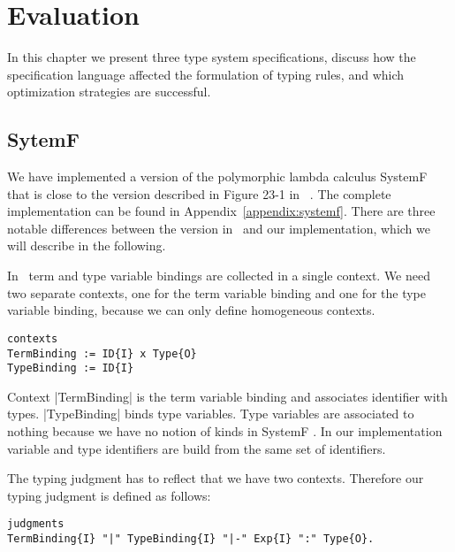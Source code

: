 \chapter{Evaluation}
\label{cha:evaluation}
In this chapter we present three type system specifications, discuss
how the specification language affected the formulation of typing
rules, and which optimization strategies are successful.
\section{SytemF}
\label{sec:sytemf}
We have implemented a version of the polymorphic lambda calculus
SystemF that is close to the version described in Figure 23-1 in
~\cite{Pierce:2002:TPL:509043}. The complete implementation can be
found in Appendix~\ref{appendix:systemf}. There are three notable
differences between the version in~\cite{Pierce:2002:TPL:509043} and
our implementation, which we will describe in the following.

In~\cite{Pierce:2002:TPL:509043} term and type variable bindings are
collected in a single context. We need two separate contexts, one for
the term variable binding and one for the type variable binding,
because we can only define homogeneous contexts.

\begin{lstlisting}[language=sltc]
contexts
TermBinding := ID{I} x Type{O}
TypeBinding := ID{I}
\end{lstlisting}

Context \code|TermBinding| is the term variable binding and associates
identifier with types. \code|TypeBinding| binds type variables. Type
variables are associated to nothing because we have no notion of kinds
in SystemF . In our implementation variable and type identifiers are
build from the same set of identifiers.

The typing judgment has to reflect that we have two
contexts. Therefore our typing judgment is defined as follows:

\begin{lstlisting}[language=sltc]
judgments
TermBinding{I} "|" TypeBinding{I} "|-" Exp{I} ":" Type{O}.
\end{lstlisting}

